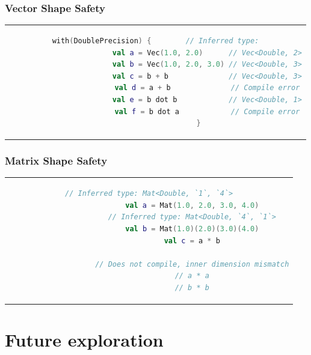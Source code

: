 \documentclass{beamer}
\begin{document}
    \begin{frame}[fragile]
        \frametitle{Vector Shape Safety}
        \begin{center}
            \begin{tabular}{c}
                \begin{lstlisting}[language=Kotlin, gobble=20]
                    with(DoublePrecision) {        // Inferred type:
                        val a = Vec(1.0, 2.0)      // Vec<Double, 2>
                        val b = Vec(1.0, 2.0, 3.0) // Vec<Double, 3>
                        val c = b + b              // Vec<Double, 3>
                        val d = a + b              // Compile error
                        val e = b dot b            // Vec<Double, 1>
                        val f = b dot a            // Compile error
                    }
                \end{lstlisting}
            \end{tabular}
        \end{center}
    \end{frame}

    \begin{frame}[fragile]
        \frametitle{Matrix Shape Safety}
        \begin{center}
            \begin{tabular}{c}
                \begin{lstlisting}[language=Kotlin, gobble=20, style=backtickstyle]
                    // Inferred type: Mat<Double, `1`, `4`>
                    val a = Mat(1.0, 2.0, 3.0, 4.0)
                    // Inferred type: Mat<Double, `4`, `1`>
                    val b = Mat(1.0)(2.0)(3.0)(4.0)
                    val c = a * b

                    // Does not compile, inner dimension mismatch
                    // a * a
                    // b * b
                \end{lstlisting}
            \end{tabular}
        \end{center}
    \end{frame}

    \section{Future exploration}
\end{document}
